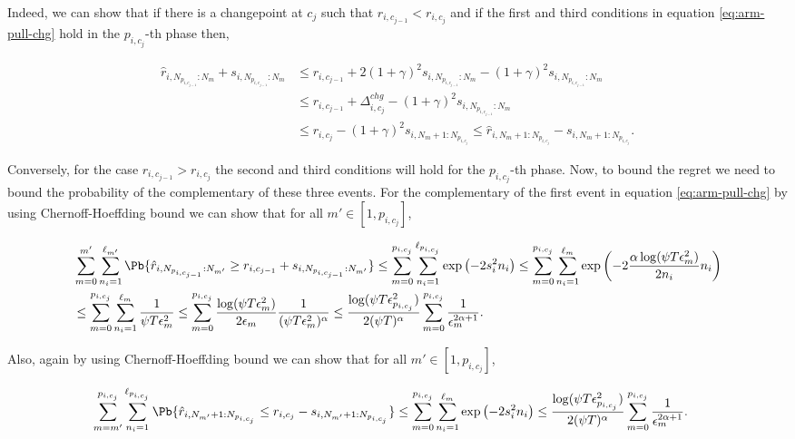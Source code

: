 \begin{customproof}{3}
Indeed, we can show that if there is a changepoint at $c_j$ such that $r_{i,c_{j-1}} < r_{i,c_j}$ and if the first and third  conditions in equation \ref{eq:arm-pull-chg} hold  in the $p_{i,c_j}$-th phase then,

\begin{align*}
\hat{r}_{i,N_{p_{i,c_{j-1}}}:N_{m}} + s_{i,N_{p_{i,c_{j-1}}}:N_{m}} &\leq {r}_{i,c_{j-1}} + 2(1+\gamma)^2 s_{i,N_{p_{i,c_{j-1}}}:N_{m}} - (1+\gamma)^2s_{i,N_{p_{i,c_{j-1}}}:N_{m}}\\
& \leq {r}_{i,c_{j-1}} + \Delta^{chg}_{i,c_j} - (1+\gamma)^2s_{i,N_{p_{i,c_{j-1}}}:N_{m}}\\
 &\leq {r}_{i,c_{j}} - (1+\gamma)^2s_{i,N_{m}+1:N_{p_{i,c_j}}} \leq \hat{r}_{i,N_{m}+1:N_{p_{i,c_j}}} - s_{i,N_{m}+1:N_{p_{i,c_j}}}.
\end{align*}

Conversely, for the case $r_{i,c_{j-1}} > r_{i,c_j}$ the second and third conditions will hold for the $p_{i,c_j}$-th phase. Now, to bound the regret we need to bound the probability of the complementary of these three events. For the complementary of the first event in equation \ref{eq:arm-pull-chg} by using Chernoff-Hoeffding bound we can show that for all $m'\in[1,p_{i,c_j}]$,

\begin{align*}
&\sum_{m=0}^{m'}\sum_{n_i=1}^{\ell_{m'}}\Pb\lbrace \hat{r}_{i,N_{p_{i,c_{j-1}}}:N_{m'}} \geq  r_{i,c_{j-1}} + s_{i,N_{p_{i,c_{j-1}}}:N_{m'}} \rbrace \leq \sum_{m=0}^{p_{i,c_j}}\sum_{n_i=1}^{\ell_{p_{i,c_j}}}\exp\left(-2s_{i}^2n_{i} \right)
\leq \sum_{m=0}^{p_{i,c_j}}\sum_{n_i=1}^{\ell_{m}}\exp\left(-2\dfrac{\alpha\log(\psi T\epsilon_{m}^2)}{2n_{i}}n_{i} \right)\\
&\leq \sum_{m=0}^{p_{i,c_j}}\sum_{n_i=1}^{\ell_{m}}\dfrac{1}{\psi T\epsilon_{m}^2} \leq \sum_{m=0}^{p_{i,c_j}}\dfrac{\log(\psi T\epsilon_{m}^2)}{2\epsilon_{m}}\dfrac{1}{(\psi T\epsilon_{m}^2 )^{\alpha}} \leq  \dfrac{\log(\psi T\epsilon_{p_{i,c_j}}^2)}{2(\psi T)^{\alpha}}\sum_{m=0}^{p_{i,c_j}}\dfrac{1}{\epsilon_{m}^{2\alpha + 1}}.
\end{align*}

Also, again by using Chernoff-Hoeffding bound we can show that for all $m'\in[1,p_{i,c_j}]$,

\begin{align*}
\sum_{m=m'}^{p_{i,c_j}}\sum_{n_i=1}^{\ell_{p_{i,c_j}}}\Pb\lbrace \hat{r}_{i,N_{m'}+1:N_{p_{i,c_j}}} \leq  r_{i,c_j} - s_{i,N_{m'}+1:N_{p_{i,c_j}}} \rbrace &\leq \sum_{m=0}^{p_{i,c_j}}\sum_{n_i=1}^{\ell_{m}}\exp\left(-2s_{i}^2n_{i} \right) \leq \dfrac{\log(\psi T\epsilon_{p_{i,c_j}}^2)}{2(\psi T)^{\alpha}}\sum_{m=0}^{p_{i,c_j}}\dfrac{1}{\epsilon_{m}^{2\alpha + 1}}.
\end{align*}


\end{customproof}
